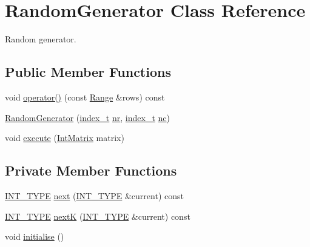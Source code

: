 \hypertarget{class_random_generator}{
\section{RandomGenerator Class Reference}
\label{class_random_generator}
}
Random generator.  


\subsection*{Public Member Functions}
\begin{CompactItemize}
\item 
void \hyperlink{class_random_generator_bfa47006c53f82e85cbc77ae5e667747}{operator()} (const \hyperlink{cowichan__tbb_8hpp_8e2057f725b08f3a15513c378a453a47}{Range} \&rows) const 
\item 
\hyperlink{class_random_generator_96274661438a80cfee1e7a33bc59f770}{RandomGenerator} (\hyperlink{cowichan_8hpp_5b04577d5d21124855deaad298595371}{index\_\-t} \hyperlink{class_random_generator_ccc3239cc9aa8571936ca78b0e82adde}{nr}, \hyperlink{cowichan_8hpp_5b04577d5d21124855deaad298595371}{index\_\-t} \hyperlink{class_random_generator_b2273a84d69579c9e9e89d0073ced26c}{nc})
\item 
void \hyperlink{class_random_generator_4c5ae77662dfca92b1677e36b124e3c4}{execute} (\hyperlink{cowichan_8hpp_82321152ddeeefe9c61350a42ed9e7af}{IntMatrix} matrix)
\end{CompactItemize}
\subsection*{Private Member Functions}
\begin{CompactItemize}
\item 
\hyperlink{cowichan_8hpp_c96945095fd0ce7186a1d00a89f77d2c}{INT\_\-TYPE} \hyperlink{class_random_generator_caea6ecf8e980861f1d370cb54eaeeda}{next} (\hyperlink{cowichan_8hpp_c96945095fd0ce7186a1d00a89f77d2c}{INT\_\-TYPE} \&current) const 
\item 
\hyperlink{cowichan_8hpp_c96945095fd0ce7186a1d00a89f77d2c}{INT\_\-TYPE} \hyperlink{class_random_generator_d0ee441c774a78abd93a50c0b08eea43}{nextK} (\hyperlink{cowichan_8hpp_c96945095fd0ce7186a1d00a89f77d2c}{INT\_\-TYPE} \&current) const 
\item 
void \hyperlink{class_random_generator_8a8390ed7e511770795cf4204d1f1df0}{initialise} ()
\end{CompactItemize}
